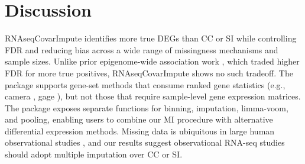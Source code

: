 \documentclass[11pt]{article}
\begin{document}
\section{Discussion}
RNAseqCovarImpute identifies more true DEGs than CC or SI while controlling FDR and reducing bias across a wide range of missingness mechanisms and sample sizes. Unlike prior epigenome-wide association work \citep{r8}, which traded higher FDR for more true positives, RNAseqCovarImpute shows no such tradeoff. The package supports gene-set methods that consume ranked gene statistics (e.g., camera \citep{r29}, gage \citep{r30}), but not those that require sample-level gene expression matrices. The package exposes separate functions for binning, imputation, limma-voom, and pooling, enabling users to combine our MI procedure with alternative differential expression methods. Missing data is ubiquitous in large human observational studies \citep{r20,r21,r22,r23,r24,r25}, and our results suggest observational RNA-seq studies should adopt multiple imputation over CC or SI.



\end{document}

